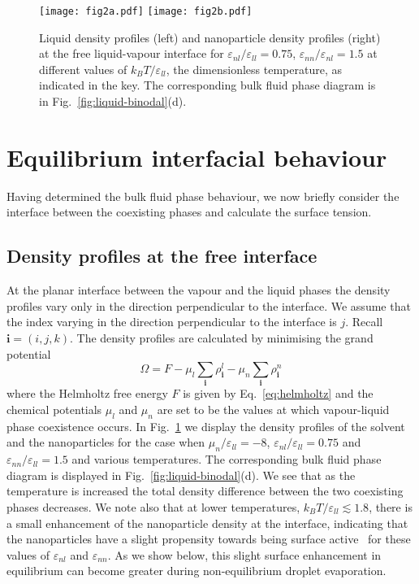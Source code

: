 \documentclass[journal=langd5,manuscript=article]{achemso}
\def\i{\mathbf{i}}
\def\e{\varepsilon}
\begin{document}
\begin{figure}
\texttt{[image: fig2a.pdf]}
\texttt{[image: fig2b.pdf]}
\caption{%
  Liquid density profiles (left) and nanoparticle density profiles
  (right) at the free liquid-vapour interface for
  $\e_{nl}/\e_{ll}=0.75$, $\e_{nn}/\e_{nl} = 1.5$ at different
  values of $k_BT/\e_{ll}$, the dimensionless temperature,
  as indicated in the key.
  The corresponding bulk fluid phase diagram is in
  Fig.~{\ref{fig:liquid-binodal}(d)}.
}
\label{fig:liquid-equ}
\end{figure}

\section{Equilibrium interfacial behaviour}\label{equilibrium}

Having determined the bulk fluid phase behaviour, we now briefly
consider the interface between the coexisting phases and calculate the
surface tension.

\subsection{Density profiles at the free interface}

At the planar interface between the vapour and the liquid phases the density
profiles vary only in the direction perpendicular to the interface. We
assume that the index varying in the direction perpendicular to the
interface is $j$. Recall $\i=(i,j,k)$. The density profiles are
calculated by minimising the grand potential
%
\begin{equation}
  \Omega = F - \mu_l \sum_\i \rho^l_\i - \mu_n \sum_\i \rho^n_\i
\label{eq:omega}
\end{equation}
%
where the Helmholtz free energy $F$ is given by Eq.~\eqref{eq:helmholtz}
and the chemical potentials $\mu_l$ and $\mu_n$ are set to be the values
at which vapour-liquid phase coexistence occurs. In
Fig.~\ref{fig:liquid-equ} we display the density profiles of the solvent
and the nanoparticles for the case when $\mu_n/\e_{ll}=-8$,
$\e_{nl}/\e_{ll}=0.75$ and $\e_{nn}/\e_{ll}=1.5$ and various
temperatures. The corresponding bulk fluid phase diagram is displayed in
Fig.~{\ref{fig:liquid-binodal}(d)}. We see that as the temperature is
increased the total density difference between the two coexisting phases
decreases. We note also that at lower temperatures, $k_BT/\e_{ll}
\lesssim 1.8$, there is a small enhancement of the nanoparticle density
at the interface, indicating that the nanoparticles have a slight
propensity towards being surface active~\cite{thinfilms} for these
values of $\e_{nl}$ and $\e_{nn}$. As we show below, this slight surface
enhancement in equilibrium can become greater during non-equilibrium droplet evaporation.
\end{document}

